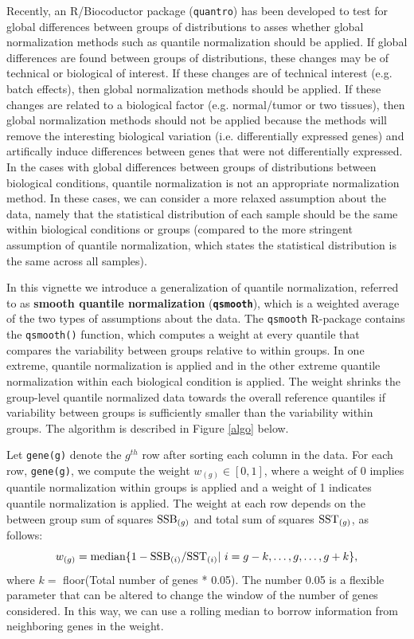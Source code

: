 \documentclass{article}\usepackage[]{graphicx}\usepackage[usenames,dvipsnames]{color}
\begin{document}
Recently, an R/Biocoductor package (\texttt{quantro}) \cite{Hicks2015} 
has been developed to test for global differences between groups of 
distributions to asses whether global normalization methods such 
as quantile normalization should be applied. If global differences
are found between groups of distributions, these changes may be of technical 
or biological of interest. If these changes are of technical interest
(e.g. batch effects), then global normalization methods should be applied. 
If these changes are related to a biological factor (e.g. normal/tumor or 
two tissues), then global normalization methods should not be applied 
because the methods will remove the interesting biological variation 
(i.e. differentially expressed genes) and artifically induce differences 
between genes that were not differentially expressed. In the cases 
with global differences between groups of distributions 
between biological conditions, quantile normalization is
not an appropriate normalization method. In
these cases, we can consider a more relaxed assumption about the data, 
namely that the statistical distribution of each sample should be the 
same within biological conditions or groups (compared to the more 
stringent assumption of quantile normalization, which states the 
statistical distribution is the same across all samples).

In this vignette we introduce a generalization of quantile 
normalization, referred to as \textbf{smooth quantile normalization} 
(\texttt{\bf{qsmooth}}), which is a weighted average of the two 
types of assumptions about the data. The \texttt{qsmooth} R-package
contains the \texttt{qsmooth()} function, which computes a weight at 
every quantile that compares the variability between groups relative 
to within groups. In one extreme, quantile normalization is applied
and in the other extreme quantile normalization within each 
biological condition is applied. The weight shrinks the group-level 
quantile normalized data towards the overall reference quantiles 
if variability between groups is sufficiently smaller than the 
variability within groups. The algorithm is described in 
Figure \ref{algo} below.

Let \texttt{gene(g)} denote the ${g}^{th}$ row after sorting 
each column in the data. For each row, \texttt{gene(g)}, we 
compute the weight $w_{(g)} \in [0, 1]$, where a weight of 0 implies 
quantile normalization within groups is applied and
a weight of 1 indicates quantile normalization is applied.
The weight at each row depends on the between group sum of squares
$\hbox{SSB}_{(g)}$ and total sum of squares $\hbox{SST}_{(g)}$,
as follows:
\begin{equation}
w_{(g)} = \hbox{median} \{1 - \hbox{SSB}_{(i)} / \hbox{SST}_{(i)} | ~i = g-k, \dots, g, \dots, g+k \},
\end{equation}
where $k=$ floor(Total number of genes * 0.05). The number 
0.05 is a flexible parameter that can be altered to change the 
window of the number of genes considered. In this way, we 
can use a rolling median to borrow information from 
neighboring genes in the weight.
\end{document}
